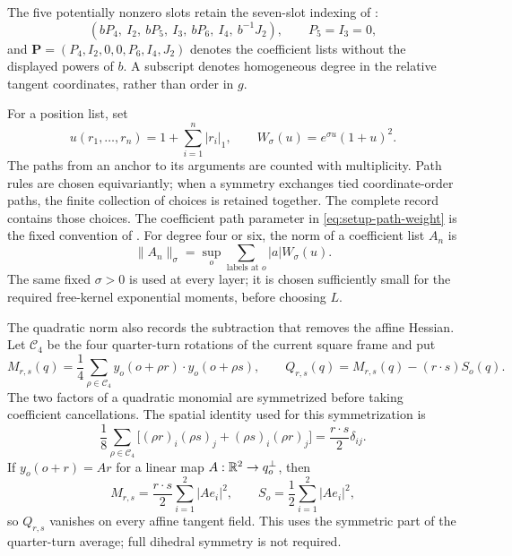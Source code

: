 The five potentially nonzero slots retain the seven-slot indexing of
:
\begin{equation}
 (bP_4,\ I_2,\ bP_5,\ I_3,\ bP_6,\ I_4,\ b^{-1}J_2),
 \qquad P_5=I_3=0,
 \label{eq:setup-slots}
\end{equation}
and
$\mathbf P=(P_4,I_2,0,0,P_6,I_4,J_2)$ denotes the coefficient lists
without the displayed powers of $b$.  A subscript denotes homogeneous
degree in the relative tangent coordinates, rather than order in $g$.

For a position list, set
\begin{equation}
 u(r_1,\ldots,r_n)=1+\sum_{i=1}^n|r_i|_1,
 \qquad W_\sigma(u)=e^{\sigma u}(1+u)^2.
 \label{eq:setup-path-weight}
\end{equation}
The paths from an anchor to its arguments are counted with multiplicity.
Path rules are chosen equivariantly; when a symmetry exchanges tied
coordinate-order paths, the finite collection of choices is retained
together.  The complete record contains those choices.  The coefficient
path parameter in \eqref{eq:setup-path-weight} is the fixed convention
of .
For degree four or six, the norm of a coefficient list $A_n$ is
\begin{equation}
 \|A_n\|_\sigma
   =\sup_o\sum_{\text{labels at }o}|a|W_\sigma(u).
 \label{eq:setup-canonical-norm}
\end{equation}
The same fixed $\sigma>0$ is used at every layer; it is chosen sufficiently
small for the required free-kernel exponential moments, before choosing
$L$.

The quadratic norm also records the subtraction that removes the affine
Hessian.  Let $\mathcal C_4$ be the four quarter-turn rotations of the
current square frame and put
\begin{equation}
 M_{r,s}(q)=\frac14\sum_{\rho\in\mathcal C_4}
       y_o(o+\rho r)\cdot y_o(o+\rho s),
 \qquad
 Q_{r,s}(q)=M_{r,s}(q)-(r\cdot s)S_o(q).
 \label{eq:setup-quadratic-packet}
\end{equation}
The two factors of a quadratic monomial are symmetrized before taking
coefficient cancellations.  The spatial identity used for this
symmetrization is
\[
 \frac18\sum_{\rho\in\mathcal C_4}
 \bigl[(\rho r)_i(\rho s)_j+(\rho s)_i(\rho r)_j\bigr]
                 =\frac{r\cdot s}{2}\delta_{ij}.
\]
If $y_o(o+r)=Ar$ for a linear map
$A:\mathbb R^2\to q_o^\perp$, then
\[
 M_{r,s}=\frac{r\cdot s}{2}\sum_{i=1}^2|Ae_i|^2,
 \qquad
 S_o=\frac12\sum_{i=1}^2|Ae_i|^2,
\]
so $Q_{r,s}$ vanishes on every affine tangent field.  This uses the
symmetric part of the quarter-turn average; full dihedral symmetry is
not required.

